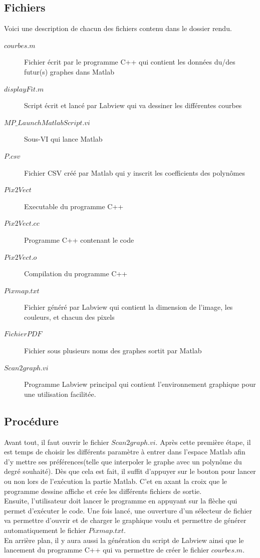 \documentclass[11pt, a4paper, oneside]{article}   	%
\begin{document}
\subsection{Fichiers}

Voici une description de chacun des fichiers contenu dans le dossier rendu.

\begin{description}
\item[$courbes.m$] Fichier écrit par le programme C++ qui contient les données du/des futur(s) graphes dans Matlab
\item[$displayFit.m$] Script écrit et lancé par Labview qui va dessiner les différentes courbes
\item[$MP\_LaunchMatlabScript.vi$] Sous-VI qui lance Matlab
\item[$P.csv$] Fichier CSV créé par Matlab qui y inscrit les coefficients des polynômes
\item[$Pix2Vect$] Executable du programme C++
\item[$Pix2Vect.cc$] Programme C++ contenant le code
\item[$Pix2Vect.o$] Compilation du programme C++
\item[$Pixmap.txt$] Fichier généré par Labview qui contient la dimension de l'image, les couleurs, et chacun des pixels
\item[$Fichier PDF$] Fichier sous plusieurs noms des graphes sortit par Matlab
\item[$Scan2graph.vi$] Programme Labview principal qui contient l'environnement graphique pour une utilisation facilitée.
\end{description}

\subsection{Procédure}
Avant tout, il faut ouvrir le fichier $Scan2graph.vi$. Après cette première étape, il est temps de choisir les différents paramètre à entrer dans l'espace Matlab afin d'y mettre ses préférences(telle que interpoler le graphe avec un polynôme du degré souhaité). Dès que cela est fait, il suffit d'appuyer sur le bouton pour lancer ou non lors de l'exécution la partie Matlab. C'et en axant la croix que le programme dessine affiche et crée les différents fichiers de sortie. \\

Ensuite, l'utilisateur doit lancer le programme en appuyant sur la flèche qui permet d'exécuter le code.
Une fois lancé, une ouverture d'un sélecteur de fichier va permettre d'ouvrir et de charger le graphique voulu et permettre de générer automatiquement le fichier $Pixmap.txt$.\\
En arrière plan, il y aura aussi la génération du script de Labview ainsi que le lancement du programme C++ qui va permettre de créer le fichier $courbes.m$.\\
\end{document}
